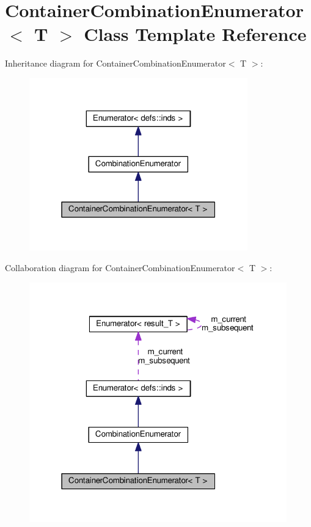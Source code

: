\hypertarget{classContainerCombinationEnumerator}{}\section{Container\+Combination\+Enumerator$<$ T $>$ Class Template Reference}
\label{classContainerCombinationEnumerator}


Inheritance diagram for Container\+Combination\+Enumerator$<$ T $>$\+:\nopagebreak
\begin{figure}[H]
\begin{center}
\leavevmode
\includegraphics[width=268pt]{classContainerCombinationEnumerator__inherit__graph}
\end{center}
\end{figure}


Collaboration diagram for Container\+Combination\+Enumerator$<$ T $>$\+:\nopagebreak
\begin{figure}[H]
\begin{center}
\leavevmode
\includegraphics[width=316pt]{classContainerCombinationEnumerator__coll__graph}
\end{center}
\end{figure}
